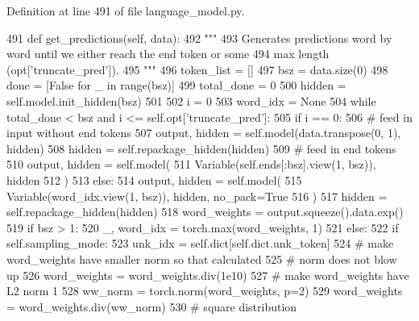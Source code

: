 Definition at line 491 of file language\+\_\+model.\+py.


\begin{DoxyCode}
491     \textcolor{keyword}{def }get\_predictions(self, data):
492         \textcolor{stringliteral}{"""}
493 \textcolor{stringliteral}{        Generates predictions word by word until we either reach the end token or some}
494 \textcolor{stringliteral}{        max length (opt['truncate\_pred']).}
495 \textcolor{stringliteral}{        """}
496         token\_list = []
497         bsz = data.size(0)
498         done = [\textcolor{keyword}{False} \textcolor{keywordflow}{for} \_ \textcolor{keywordflow}{in} range(bsz)]
499         total\_done = 0
500         hidden = self.model.init\_hidden(bsz)
501 
502         i = 0
503         word\_idx = \textcolor{keywordtype}{None}
504         \textcolor{keywordflow}{while} total\_done < bsz \textcolor{keywordflow}{and} i <= self.opt[\textcolor{stringliteral}{'truncate\_pred'}]:
505             \textcolor{keywordflow}{if} i == 0:
506                 \textcolor{comment}{# feed in input without end tokens}
507                 output, hidden = self.model(data.transpose(0, 1), hidden)
508                 hidden = self.repackage\_hidden(hidden)
509                 \textcolor{comment}{# feed in end tokens}
510                 output, hidden = self.model(
511                     Variable(self.ends[:bsz].view(1, bsz)), hidden
512                 )
513             \textcolor{keywordflow}{else}:
514                 output, hidden = self.model(
515                     Variable(word\_idx.view(1, bsz)), hidden, no\_pack=\textcolor{keyword}{True}
516                 )
517             hidden = self.repackage\_hidden(hidden)
518             word\_weights = output.squeeze().data.exp()
519             \textcolor{keywordflow}{if} bsz > 1:
520                 \_, word\_idx = torch.max(word\_weights, 1)
521             \textcolor{keywordflow}{else}:
522                 \textcolor{keywordflow}{if} self.sampling\_mode:
523                     unk\_idx = self.dict[self.dict.unk\_token]
524                     \textcolor{comment}{# make word\_weights have smaller norm so that calculated}
525                     \textcolor{comment}{# norm does not blow up}
526                     word\_weights = word\_weights.div(1e10)
527                     \textcolor{comment}{# make word\_weights have L2 norm 1}
528                     ww\_norm = torch.norm(word\_weights, p=2)
529                     word\_weights = word\_weights.div(ww\_norm)
530                     \textcolor{comment}{# square distribution}

\end{DoxyCode}
